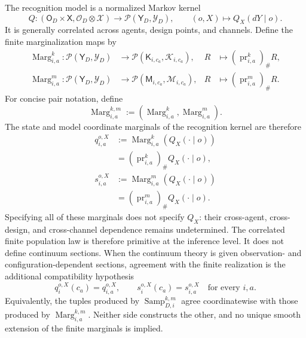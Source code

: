 The recognition model is a normalized Markov kernel
\begin{equation}
Q:(\mathsf O_D\times\mathsf X,
\mathscr O_D\otimes\mathscr X)
\longrightarrow\mathcal P(\mathsf Y_D,\mathscr Y_D),
\qquad
(o,X)\longmapsto Q_X(dY\mid o).
\label{eq:recognition-kernel-type}
\end{equation}
It is generally correlated across agents, design points, and channels. Define the finite marginalization maps by
\begin{align}
\operatorname{Marg}_{i,a}^{k}:
\mathcal P(\mathsf Y_D,\mathscr Y_D)
&\longrightarrow\mathcal P(\mathsf K_{i,c_a},\mathscr K_{i,c_a}),
&R&\longmapsto\left(\operatorname{pr}_{i,a}^{k}\right)_{\#}R,
\label{eq:finite-state-marginalization-map}\\
\operatorname{Marg}_{i,a}^{m}:
\mathcal P(\mathsf Y_D,\mathscr Y_D)
&\longrightarrow\mathcal P(\mathsf M_{i,c_a},\mathscr M_{i,c_a}),
&R&\longmapsto\left(\operatorname{pr}_{i,a}^{m}\right)_{\#}R.
\label{eq:finite-model-marginalization-map}
\end{align}
For concise pair notation, define
\begin{equation}
\operatorname{Marg}_{i,a}^{k,m}
:=\left(\operatorname{Marg}_{i,a}^{k},
\operatorname{Marg}_{i,a}^{m}\right).
\label{eq:collective-finite-marginalization-map}
\end{equation}
The state and model coordinate marginals of the recognition kernel are therefore
\begin{equation}
\begin{aligned}
q_{i,a}^{o,X}
&:=\operatorname{Marg}_{i,a}^{k}\left(Q_X(\mathord\cdot\mid o)\right)\\
&=\left(\operatorname{pr}_{i,a}^{k}\right)_{\#}Q_X(\mathord\cdot\mid o),\\
s_{i,a}^{o,X}
&:=\operatorname{Marg}_{i,a}^{m}\left(Q_X(\mathord\cdot\mid o)\right)\\
&=\left(\operatorname{pr}_{i,a}^{m}\right)_{\#}Q_X(\mathord\cdot\mid o).
\end{aligned}
\label{eq:recognition-marginal-sections}
\end{equation}
Specifying all of these marginals does not specify \(Q_X\): their cross-agent, cross-design, and cross-channel dependence remains undetermined. The correlated finite population law is therefore primitive at the inference level. It does not define continuum sections. When the continuum theory is given observation- and configuration-dependent sections, agreement with the finite realization is the additional compatibility hypothesis
\begin{equation}
q_i^{o,X}(c_a)=q_{i,a}^{o,X},
\qquad
s_i^{o,X}(c_a)=s_{i,a}^{o,X}
\quad\text{for every }i,a.
\label{eq:continuum-finite-marginal-compatibility}
\end{equation}
Equivalently, the tuples produced by \(\operatorname{Samp}_{D,i}^{k,m}\) agree coordinatewise with those produced by \(\operatorname{Marg}_{i,a}^{k,m}\). Neither side constructs the other, and no unique smooth extension of the finite marginals is implied.

